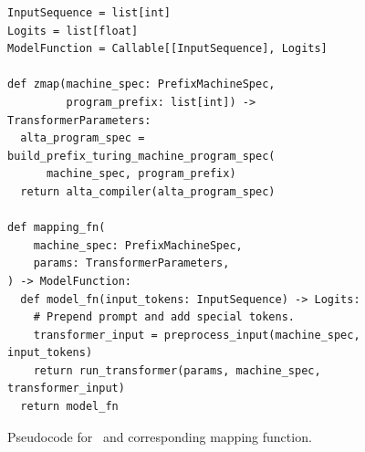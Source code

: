 \begin{figure}[ht]
\centering
\begin{verbatim}
InputSequence = list[int]
Logits = list[float]
ModelFunction = Callable[[InputSequence], Logits]

def zmap(machine_spec: PrefixMachineSpec,
         program_prefix: list[int]) -> TransformerParameters:
  alta_program_spec = build_prefix_turing_machine_program_spec(
      machine_spec, program_prefix)
  return alta_compiler(alta_program_spec)

def mapping_fn(
    machine_spec: PrefixMachineSpec,
    params: TransformerParameters,
) -> ModelFunction:
  def model_fn(input_tokens: InputSequence) -> Logits:
    # Prepend prompt and add special tokens.
    transformer_input = preprocess_input(machine_spec, input_tokens)
    return run_transformer(params, machine_spec, transformer_input)
  return model_fn
\end{verbatim}
\caption{Pseudocode for \zmap~and corresponding mapping function.}
\label{fig:zmap_pseudocode}
\end{figure}

